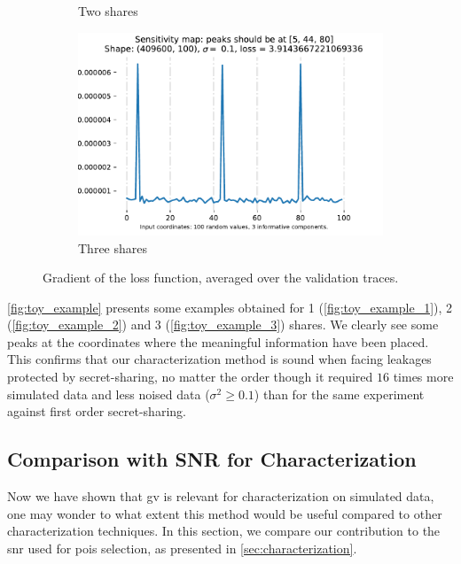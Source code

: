 \begin{figure}
\begin{subfigure}{0.49 \textwidth}
		\caption{Two shares}
		\label{fig:toy_example_2}
	\end{subfigure}
	\begin{subfigure}[]{0.49 \textwidth}
		\includegraphics[width=\textwidth]{figures/experience_1/3_shares_shape_409600_100_100_n_hidden_0_1_sigma}
		\caption{Three shares}
		\label{fig:toy_example_3}
	\end{subfigure}
	\caption{Gradient of the loss function, averaged over the validation traces.}
	\label{fig:toy_example}
\end{figure} 
\autoref{fig:toy_example} presents some examples obtained for 1 (\autoref{fig:toy_example_1}), 2 (\autoref{fig:toy_example_2}) and 3 (\autoref{fig:toy_example_3}) shares. 
We clearly see some peaks at the coordinates where the meaningful information have been placed.
This confirms that our characterization method is sound when facing leakages protected by secret-sharing, no matter the order though it required \(16\) times more simulated data and less noised data (\(\sigma^2 \geq 0.1\)) than for the same experiment against first order secret-sharing.


\subsection{Comparison with SNR for Characterization}
\label{sec:related_works}
Now we have shown that \gls{gv} is relevant for characterization on simulated data, one may wonder to what extent this method would be useful compared to other characterization techniques.
In this section, we compare our contribution to the \gls{snr} used for \glspl{poi} selection, as presented in \autoref{sec:characterization}.

